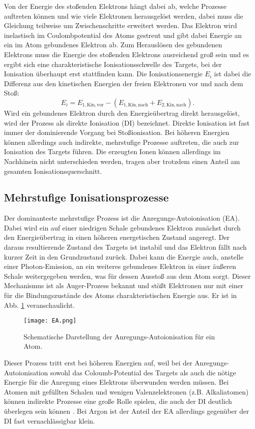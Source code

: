 Von der Energie des stoßenden Elektrons hängt dabei ab, welche Prozesse auftreten können und wie viele Elektronen herausgelöst werden, dabei muss die Gleichung teilweise um Zwischenschritte erweitert werden. Das Elektron wird inelastisch im Coulombpotential des Atoms gestreut und gibt dabei Energie an ein im Atom gebundenes Elektron ab. Zum Herauslösen des gebundenen Elektrons muss die Energie des stoßenden Elektrons ausreichend groß sein und es ergibt sich eine charakteristische Ionisationsschwelle des Targets, bei der Ionisation überhaupt erst stattfinden kann. Die Ionisationsenergie $E_i$ ist dabei die Differenz aus den kinetischen Energien der freien Elektronen vor und nach dem Stoß: 
\begin{equation}
    E_i = E_{\text{1}, \text{Kin}, \text{vor}} - \left( E_{\text{1}, \text{Kin}, \text{nach}} + E_{\text{2}, \text{Kin}, \text{nach}} \right).\end{equation} 
Wird ein gebundenes Elektron durch den Energieübertrag direkt herausgelöst, wird der Prozess als direkte Ionisation (DI) bezeichnet. Direkte Ionisation ist fast immer der dominierende Vorgang bei Stoßionisation. Bei höheren Energien können allerdings auch indirekte, mehrstufige Prozesse auftreten, die auch zur Ionisation des Targets führen. Die erzeugten Ionen können allerdings im Nachhinein nicht unterschieden werden, tragen aber trotzdem einen Anteil am gesamten Ionisationsquerschnitt.

\subsection{Mehrstufige Ionisationsprozesse}
Der dominanteste mehrstufige Prozess ist die Anregungs-Autoionisation (EA). Dabei wird ein auf einer niedrigen Schale gebundenes Elektron zunächst durch den Energieübertrag in einen höheren energetischen Zustand angeregt. Der daraus resultierende Zustand des Targets ist instabil und das Elektron fällt nach kurzer Zeit in den Grundzustand zurück. Dabei kann die Energie auch, anstelle einer Photon-Emission, an ein weiteres gebundenes Elektron in einer äußeren Schale weitergegeben werden, was für dessen Ausstoß aus dem Atom sorgt. Dieser Mechanismus ist als Auger-Prozess bekannt und stößt Elektronen nur mit einer für die Bindungszustände des Atoms charakteristischen Energie aus. Er ist in Abb. \ref{fig:EA} veranschaulicht.
\begin{figure}[h]
    \centering
    \texttt{[image: EA.png]}
    \caption{Schematische Darstellung der Anregungs-Autoionisation für ein Atom.}
    \label{fig:EA}
\end{figure}
Dieser Prozess tritt erst bei höheren Energien auf, weil bei der Anregungs-Autoionisation sowohl das Coloumb-Potential des Targets als auch die nötige Energie für die Anregung eines Elektrons überwunden werden müssen. Bei Atomen mit gefüllten Schalen und wenigen Valenzelektronen (z.B. Alkaliatomen) können indirekte Prozesse eine große Rolle spielen, die auch der DI deutlich überlegen sein können \cite{EII}. Bei Argon ist der Anteil der EA allerdings gegenüber der DI fast vernachlässigbar klein. 

